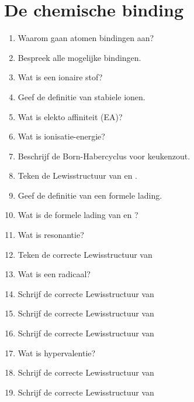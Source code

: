 \documentclass[a4paper,12pt]{article}
\begin{document}
    \maketitle
    
    \section{De chemische binding}

    \begin{enumerate}
        \item Waarom gaan atomen bindingen aan?
        \item Bespreek alle mogelijke bindingen.
        \item Wat is een ionaire stof?
        \item Geef de definitie van stabiele ionen.
        \item Wat is elekto affiniteit (EA)?
        \item Wat is ionisatie-energie?
        \item Beschrijf de Born-Habercyclus voor keukenzout.
        \item Teken de Lewisstructuur van  en .
        \item Geef de definitie van een formele lading.
        \item Wat is de formele lading van  en ?
        \item Wat is resonantie?
        \item Teken de correcte Lewisstructuur van 
        \item Wat is een radicaal?
        \item Schrijf de correcte Lewisstructuur van 
        \item Schrijf de correcte Lewisstructuur van 
        \item Schrijf de correcte Lewisstructuur van 
        \item Wat is hypervalentie?
        \item Schrijf de correcte Lewisstructuur van 
        \item Schrijf de correcte Lewisstructuur van 
    \end{enumerate}
\end{document}
